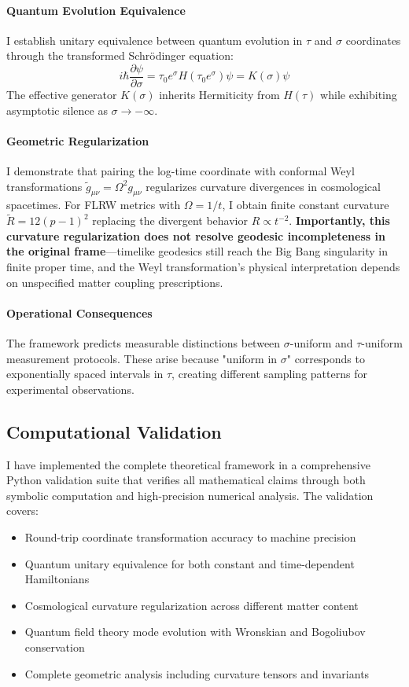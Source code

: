 \paragraph{Quantum Evolution Equivalence} I establish unitary equivalence between quantum evolution in $\tau$ and $\sigma$ coordinates through the transformed Schrödinger equation:
\begin{equation}
i\hbar \frac{\partial \psi}{\partial \sigma} = \tau_0 e^\sigma H(\tau_0 e^\sigma) \psi = K(\sigma) \psi
\end{equation}
The effective generator $K(\sigma)$ inherits Hermiticity from $H(\tau)$ while exhibiting asymptotic silence as $\sigma \to -\infty$.

\paragraph{Geometric Regularization} I demonstrate that pairing the log-time coordinate with conformal Weyl transformations $\tilde{g}_{\mu\nu} = \Omega^2 g_{\mu\nu}$ regularizes curvature divergences in cosmological spacetimes. For FLRW metrics with $\Omega = 1/t$, I obtain finite constant curvature $\tilde{R} = 12(p-1)^2$ replacing the divergent behavior $R \propto t^{-2}$. \textbf{Importantly, this curvature regularization does not resolve geodesic incompleteness in the original frame}—timelike geodesics still reach the Big Bang singularity in finite proper time, and the Weyl transformation's physical interpretation depends on unspecified matter coupling prescriptions.

\paragraph{Operational Consequences} The framework predicts measurable distinctions between $\sigma$-uniform and $\tau$-uniform measurement protocols. These arise because "uniform in $\sigma$" corresponds to exponentially spaced intervals in $\tau$, creating different sampling patterns for experimental observations.

\subsection{Computational Validation}

I have implemented the complete theoretical framework in a comprehensive Python validation suite that verifies all mathematical claims through both symbolic computation and high-precision numerical analysis. The validation covers:
\begin{itemize}
\item Round-trip coordinate transformation accuracy to machine precision
\item Quantum unitary equivalence for both constant and time-dependent Hamiltonians
\item Cosmological curvature regularization across different matter content
\item Quantum field theory mode evolution with Wronskian and Bogoliubov conservation
\item Complete geometric analysis including curvature tensors and invariants
\end{itemize}

